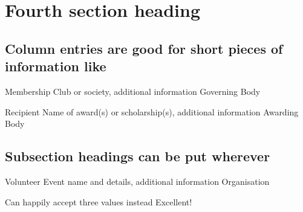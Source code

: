\section{Fourth section heading}

\subsection{Column entries are good for short pieces of information like}

  	{Membership}
    {Club or society, additional information}
    {Governing Body}

  	{Recipient}
  	{Name of award(s) or scholarship(s), additional information}
  	{Awarding Body}

\subsection{Subsection headings can be put wherever}

    {Volunteer}
    {Event name and details, additional information}
    {Organisation}
    
	{Can happily accept three values instead}
	{Excellent!}